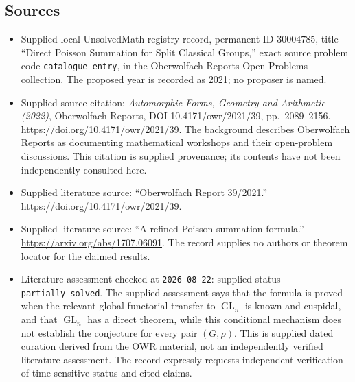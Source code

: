 \documentclass[11pt]{article}
\begin{document}
\subsection{Sources}
\begin{itemize}
\item Supplied local UnsolvedMath registry record, permanent ID \(30004785\), title ``Direct Poisson Summation for Split Classical Groups,'' exact source problem code \texttt{catalogue entry}, in the Oberwolfach Reports Open Problems collection. The proposed year is recorded as 2021; no proposer is named.
\item Supplied source citation: \emph{Automorphic Forms, Geometry and Arithmetic (2022)}, Oberwolfach Reports, DOI 10.4171/owr/2021/39, pp.\ 2089--2156. \url{https://doi.org/10.4171/owr/2021/39}. The background describes Oberwolfach Reports as documenting mathematical workshops and their open-problem discussions. This citation is supplied provenance; its contents have not been independently consulted here.
\item Supplied literature source: ``Oberwolfach Report 39/2021.'' \url{https://doi.org/10.4171/owr/2021/39}.
\item Supplied literature source: ``A refined Poisson summation formula.'' \url{https://arxiv.org/abs/1707.06091}. The record supplies no authors or theorem locator for the claimed results.
\item Literature assessment checked at \texttt{2026-08-22}: supplied status \texttt{partially\_solved}. The supplied assessment says that the formula is proved when the relevant global functorial transfer to \(\operatorname{GL}_n\) is known and cuspidal, and that \(\operatorname{GL}_n\) has a direct theorem, while this conditional mechanism does not establish the conjecture for every pair \((G,\rho)\). This is supplied dated curation derived from the OWR material, not an independently verified literature assessment. The record expressly requests independent verification of time-sensitive status and cited claims.
\end{itemize}
\end{document}
